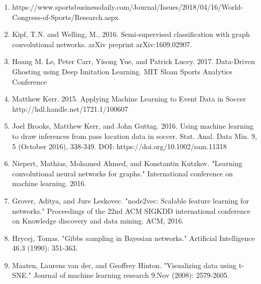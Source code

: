 \begin{enumerate}

\item https://www.sportsbusinessdaily.com/Journal/Issues/2018/04/16/World-Congress-of-Sports/Research.aspx 

\item Kipf, T.N. and Welling, M., 2016. Semi-supervised classification with graph convolutional networks. arXiv preprint         arXiv:1609.02907.

\item Hoang M. Le, Peter Carr, Yisong Yue, and Patrick Lucey. 2017. Data-Driven Ghosting using Deep Imitation Learning. MIT Sloan Sports Analytics Conference

\item Matthew Kerr. 2015. Applying Machine Learning to Event Data in Soccer    http://hdl.handle.net/1721.1/100607

\item Joel Brooks, Matthew Kerr, and John Guttag. 2016. Using machine learning to draw inferences from pass location data in soccer. Stat. Anal. Data Min. 9, 5 (October 2016), 338-349. DOI: https://doi.org/10.1002/sam.11318 

\item Niepert, Mathias, Mohamed Ahmed, and Konstantin Kutzkov. "Learning convolutional neural networks for graphs." International conference on machine learning. 2016.

\item Grover, Aditya, and Jure Leskovec. "node2vec: Scalable feature learning for networks." Proceedings of the 22nd ACM SIGKDD international conference on Knowledge discovery and data mining. ACM, 2016.

\item Hrycej, Tomas. "Gibbs sampling in Bayesian networks." Artificial Intelligence 46.3 (1990): 351-363.

\item Maaten, Laurens van der, and Geoffrey Hinton. "Visualizing data using t-SNE." Journal of machine learning research 9.Nov (2008): 2579-2605.



\end{enumerate}
